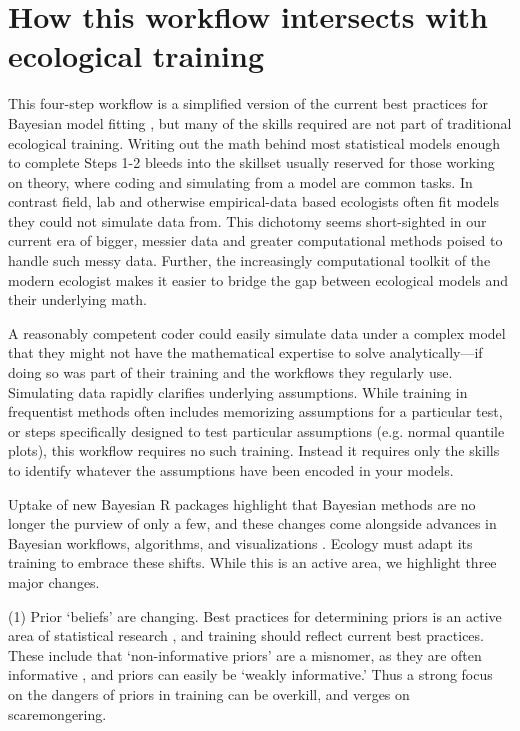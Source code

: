 \documentclass[11pt]{article}
\begin{document}
\section*{How this workflow intersects with ecological training} 

This four-step workflow is a simplified version of the current best practices for Bayesian model fitting  \citep{betanworkflow,vandeschoot2021}, but many of the skills required are not part of traditional ecological training. Writing out the math behind most statistical models enough to complete Steps 1-2 bleeds into the skillset usually reserved for those working on theory, where coding and simulating from a model are common tasks. In contrast field, lab and otherwise empirical-data based ecologists often fit models they could not simulate data from. This dichotomy seems short-sighted in our current era of bigger, messier data and greater computational methods poised to handle such messy data. Further, the increasingly computational toolkit of the modern ecologist makes it easier to bridge the gap between ecological models and their underlying math. 

A reasonably competent coder could easily simulate data under a complex model that they might not have the mathematical expertise to solve analytically---if doing so was part of their training and the workflows they regularly use. 
Simulating data rapidly clarifies underlying assumptions. While training in frequentist methods often includes memorizing assumptions for a particular test, or steps specifically designed to test particular assumptions (e.g. normal quantile plots), this workflow requires no such training. Instead it requires only the skills to identify whatever the assumptions have been encoded in your models. 

Uptake of new Bayesian \textsf{R} packages highlight that Bayesian methods are no longer the purview of only a few, and these changes come alongside advances in Bayesian workflows, algorithms, and visualizations \citep[e.g.][]{betanworkflow,vandeschoot2021,gabryvis}. Ecology must adapt its training to embrace these shifts. While this is an active area, we highlight three major changes.

(1) Prior `beliefs' are changing. Best practices for determining priors is an active area of statistical research \citep{BDA,regotherstories,betanprior}, and training should reflect current best practices. These include that `non-informative priors' are a misnomer, as they are often informative  \citep{lemoine2019}, and priors can easily be `weakly informative.' Thus a strong focus on the dangers of priors in training can be overkill, and verges on scaremongering. 
\end{document}
